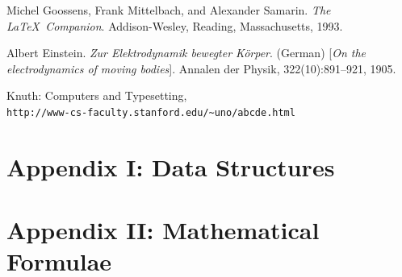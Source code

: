 \documentclass[]{book}
\renewcommand\cftchapafterpnum{\vskip 10pt}
\begin{document}
  \backmatter
  \setlength{\cftbeforechapskip}{15pt}
  \renewcommand\cftchapafterpnum{\vskip 10pt}
  \renewcommand\bibname{\large{References}}
  \begin{thebibliography}{9}
  Michel Goossens, Frank Mittelbach, and Alexander Samarin.
  \textit{The \LaTeX\ Companion}.
  Addison-Wesley, Reading, Massachusetts, 1993.

  Albert Einstein.
  \textit{Zur Elektrodynamik bewegter K{\"o}rper}. (German)
  [\textit{On the electrodynamics of moving bodies}].
  Annalen der Physik, 322(10):891–921, 1905.

  Knuth: Computers and Typesetting,
  \\\texttt{http://www-cs-faculty.stanford.edu/\~{}uno/abcde.html}
  \end{thebibliography}

  \appendix
  \chapter{\large{Appendix I: \textnormal{Data Structures}}}
  \chapter{\large{Appendix II: \textnormal{Mathematical Formulae}}}
  \printindex
\end{document}
